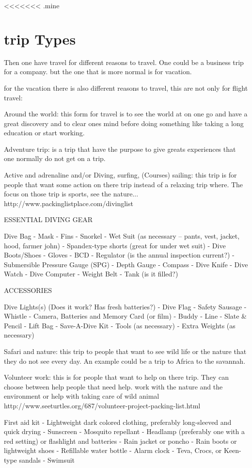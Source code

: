 <<<<<<< .mine
\section{trip Types}
Then one have travel for different reasons to travel.
One could be a business trip for a company. but the one that is more normal is for vacation.

for the vacation there is also different reasons to travel, this are not only for flight travel:

Around the world:
this form for travel is to see the world at on one go and have a great discovery and to clear ones mind before doing something like taking a long education or start working.

Adventure trip:
is a trip that have the purpose to give greats experiences that one normally do not get on a trip.

Active and adrenaline and/or Diving, surfing, (Courses) sailing:
this trip is for people that want some action on there trip instead of a relaxing trip where. The focus on those trip is sports, see the nature...
http://www.packinglistplace.com/divinglist

ESSENTIAL DIVING GEAR

Dive Bag - Mask - Fins - Snorkel - Wet Suit (as necessary -- pants, vest, jacket, hood, farmer john) - Spandex-type shorts (great for under wet suit) - Dive Boots/Shoes - Gloves - BCD - Regulator (is the annual inspection current?) - Submersible Pressure Gauge (SPG) - Depth Gauge - Compass - Dive Knife - Dive Watch - Dive Computer - Weight Belt - Tank (is it filled?)

ACCESSORIES

Dive Lights(s) (Does it work? Has fresh batteries?) - Dive Flag - Safety Sausage - Whistle - Camera, Batteries and Memory Card (or film) - Buddy - Line - Slate & Pencil - Lift Bag - Save-A-Dive Kit - Tools (as necessary) - Extra Weights (as necessary)


Safari and nature:
this trip to people that want to see wild life or the nature that they do not see every day. An example could be a trip to Africa to the savannah.

Volunteer work:
this is for people that want to help on there trip. They can choose between help people that need help. work with the nature and the environment or help with taking care of wild animal
http://www.seeturtles.org/687/volunteer-project-packing-list.html

First aid kit - Lightweight dark colored clothing, preferably long-sleeved and quick drying - Sunscreen - Mosquito repellant - Headlamp (preferably one with a red setting) or flashlight and batteries - Rain jacket or poncho - Rain boots or lightweight shoes - Refillable water bottle - Alarm clock - Teva, Crocs, or Keen-type sandals - Swimsuit

